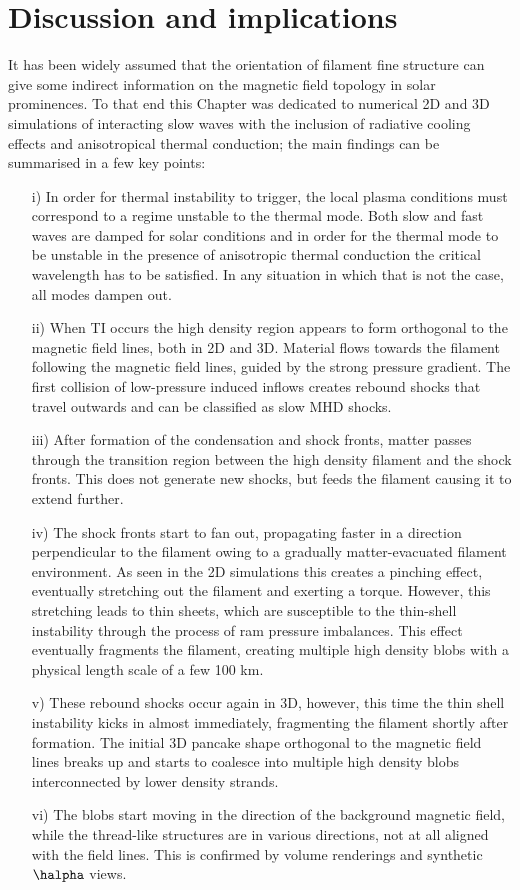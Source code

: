 \section{Discussion and implications}
It has been widely assumed that the orientation of filament fine structure can give some indirect information on the magnetic field topology in solar prominences. To that end this Chapter was dedicated to numerical 2D and 3D simulations of interacting slow waves with the inclusion of radiative cooling effects and anisotropical thermal conduction; the main findings can be summarised in a few key points:
\begin{enumerate}
  \item[i)] In order for thermal instability to trigger, the local plasma conditions must correspond to a regime unstable to the thermal mode. Both slow and fast waves are damped for solar conditions and in order for the thermal mode to be unstable in the presence of anisotropic thermal conduction the critical wavelength has to be satisfied. In any situation in which that is not the case, all modes dampen out.
  \item[ii)] When TI occurs the high density region appears to form orthogonal to the magnetic field lines, both in 2D and 3D. Material flows towards the filament following the magnetic field lines, guided by the strong pressure gradient. The first collision of low-pressure induced inflows creates rebound shocks that travel outwards and can be classified as slow MHD shocks.
  \item[iii)] After formation of the condensation and shock fronts, matter passes through the transition region between the high density filament and the shock fronts. This does not generate new shocks, but feeds the filament causing it to extend further.
  \item[iv)] The shock fronts start to fan out, propagating faster in a direction perpendicular to the filament owing to a gradually matter-evacuated filament environment. As seen in the 2D simulations this creates a pinching effect, eventually stretching out the filament and exerting a torque. However, this stretching leads to thin sheets, which are susceptible to the thin-shell instability through the process of ram pressure imbalances. This effect eventually fragments the filament, creating multiple high density blobs with a physical length scale of a few 100 km.
  \item[v)] These rebound shocks occur again in 3D, however, this time the thin shell instability kicks in almost immediately, fragmenting the filament shortly after formation. The initial 3D pancake shape orthogonal to the magnetic field lines breaks up and starts to coalesce into multiple high density blobs interconnected by lower density strands.
  \item[vi)] The blobs start moving in the direction of the background magnetic field, while the thread-like structures are in various directions, not at all aligned with the field lines. This is confirmed by volume renderings and synthetic $\halpha$ views.
\end{enumerate}
